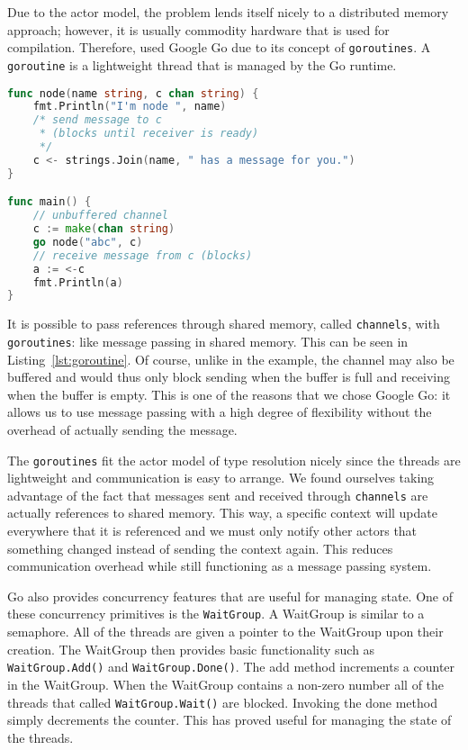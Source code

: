\documentclass{acm_proc_article-sp}
\begin{document}

Due to the actor model, the problem lends itself nicely to a distributed memory
approach; however, it is usually commodity hardware that is used for
compilation. Therefore, used Google Go due to its concept of
\texttt{goroutines}. A \texttt{goroutine} is a lightweight thread that is
managed by the Go runtime.

\begin{lstlisting}[caption=Small \texttt{goroutine} example with
\texttt{channels},language=Go,label=lst:goroutine]
func node(name string, c chan string) {
	fmt.Println("I'm node ", name)
	/* send message to c
	 * (blocks until receiver is ready)
	 */
	c <- strings.Join(name, " has a message for you.")
}

func main() {
	// unbuffered channel
	c := make(chan string)
	go node("abc", c)
	// receive message from c (blocks)
	a := <-c
	fmt.Println(a)
}
\end{lstlisting}

It is possible to pass references through shared memory, called
\texttt{channels}, with \texttt{goroutines}: like message passing in shared
memory. This can be seen in Listing~\ref{lst:goroutine}. Of course, unlike in
the example, the channel may also be buffered and would thus only block sending
when the buffer is full and receiving when the buffer is empty. This is one of
the reasons that we chose Google Go: it allows us to use message passing
with a high degree of flexibility without the overhead of actually sending the message.


The \texttt{goroutines} fit the actor model of type resolution nicely since
the threads are lightweight and communication is easy to arrange. We found ourselves taking advantage of the fact that messages sent and received through \texttt{channels} are actually references to shared memory. This way, a specific context will update everywhere that it
is referenced and we must only notify other actors that something changed
instead of sending the context again. This reduces communication overhead while
still functioning as a message passing system.

Go also provides concurrency features that are useful for managing state. One of these concurrency primitives is the \texttt{WaitGroup}. A WaitGroup is similar to a semaphore. All of the threads are given a pointer to the WaitGroup upon their creation. The WaitGroup then provides basic functionality such as \lstinline!WaitGroup.Add()! and \lstinline!WaitGroup.Done()!. The add method increments a counter in the WaitGroup. When the WaitGroup contains a non-zero number all of the threads that called \lstinline!WaitGroup.Wait()! are blocked. Invoking the done method simply decrements the counter. This has proved useful for managing the state of the threads.
\end{document}
